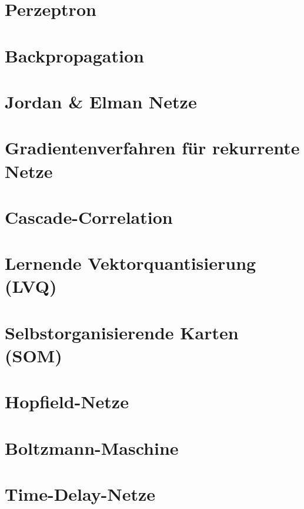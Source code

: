 \documentclass[fleqn,10pt]{SelfArx} %
\begin{document}
\section{Perzeptron}


\section{Backpropagation}


\section{Jordan \& Elman Netze}


\section{Gradientenverfahren für rekurrente Netze}


\section{Cascade-Correlation}


\section{Lernende Vektorquantisierung (LVQ)}


\section{Selbstorganisierende Karten (SOM)}


\section{Hopfield-Netze}


\section{Boltzmann-Maschine}


\section{Time-Delay-Netze}

\end{document}

